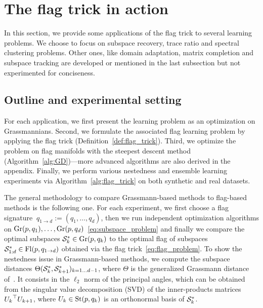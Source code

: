 \section{The flag trick in action}\label{sec:examples}
In this section, we provide some applications of the flag trick to several learning problems. We choose to focus on subspace recovery, trace ratio and spectral clustering problems. Other ones, like domain adaptation, matrix completion and subspace tracking are developed or mentioned in the last subsection but not experimented for conciseness.

\subsection{Outline and experimental setting}
For each application, we first present the learning problem as an optimization on Grassmannians. Second, we formulate the associated flag learning problem by applying the flag trick (Definition~\ref{def:flag_trick}). Third, we optimize the problem on flag manifolds with the steepest descent method (Algorithm~\ref{alg:GD})---more advanced algorithms are also derived in the appendix. 
Finally, we perform various nestedness and ensemble learning experiments via Algorithm~\ref{alg:flag_trick} on both synthetic and real datasets.

The general methodology to compare Grassmann-based methods to flag-based methods is the following one. For each experiment, we first choose a flag signature $~{q_{1\rightarrow d} := (q_1, \dots, q_d)}$, then we run independent optimization algorithms on $\Gr(p, q_1), \dots, \Gr(p, q_d)$~\eqref{eq:subspace_problem} and finally we compare the optimal subspaces $\S_k^* \in \Gr(p, q_k)$ to the optimal flag of subspaces $\Sf^* \in \Fl(p, q_{1\rightarrow d})$ obtained via the flag trick~\eqref{eq:flag_problem}. 
To show the nestedness issue in Grassmann-based methods, we compute the subspace distances $\Theta(\S_k^*, \S_{k+1}^*)_{k=1\dots d-1}$, where $\Theta$ is the generalized Grassmann distance of~\citet[Eq.~(14)]{ye_schubert_2016}. It consists in the $\ell_2$ norm of the principal angles, which can be obtained from the singular value decomposition (SVD) of the inner-products matrices ${U_k}\T {U_{k+1}}$, where $U_k \in \St(p, q_k)$ is an orthonormal basis of $\S_k^*$.

